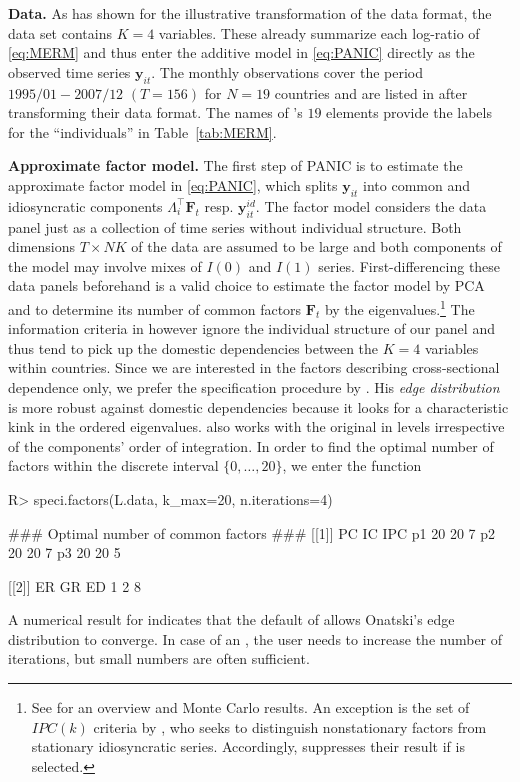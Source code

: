 \textbf{Data.} As  has shown for the illustrative transformation of the data format, the data set  contains $ K=4 $ variables. These already summarize each log-ratio of \eqref{eq:MERM} and thus enter the additive model in \eqref{eq:PANIC} directly as the observed time series $ \boldsymbol{y}_{it} $. The monthly observations cover the period $ 1995/01 - 2007/12 $ $ (T = 156) $ for $ N = 19 $ countries and are listed in  after transforming their data format. The names of 's $ 19 $ elements provide the labels for the ``individuals'' in Table~\ref{tab:MERM}.


\textbf{Approximate factor model.} The first step of PANIC is to estimate the approximate factor model in \eqref{eq:PANIC}, which splits $ \boldsymbol{y}_{it} $ into common and idiosyncratic components $ \Lambda_i^\top \boldsymbol{F}_t $ resp. $ \boldsymbol{y}^{i \! d}_{it} $. The factor model considers the data panel just as a collection of time series without individual structure. Both dimensions $ T \times NK $ of the data are assumed to be large and both components of the model may involve mixes of $  I(0) $ and $ I(1) $ series. First-differencing these data panels beforehand is a valid choice to estimate the factor model by PCA \citep{BaiNg2004} and to determine its number of common factors $ \boldsymbol{F}_t $ by the eigenvalues.\footnote{See \citet{CoronaEtAl2017} for an overview and Monte Carlo results. An exception is the set of $ IPC(k) $ criteria by \citet{Bai2004}, who seeks to distinguish nonstationary factors from stationary idiosyncratic series. Accordingly,  suppresses their result if  is selected.} The information criteria in \code{[[1]]} however ignore the individual structure of our panel and thus tend to pick up the domestic dependencies between the $ K=4 $ variables within countries. Since we are interested in the factors describing cross-sectional dependence only, we prefer the specification procedure by \citet{Onatski2010}. His \textit{edge distribution}  is more robust against domestic dependencies because it looks for a characteristic kink in the ordered eigenvalues.  also works with the original  in levels irrespective of the components' order of integration. In order to find the optimal number of factors within the discrete interval $ \lbrace 0,\ldots,20 \rbrace $, we enter the  function 
\begin{CodeChunk}
\begin{CodeInput}
R> speci.factors(L.data, k_max=20, n.iterations=4)
\end{CodeInput}
\begin{CodeOutput}
### Optimal number of common factors ###
[[1]]
   PC IC IPC
p1 20 20   7
p2 20 20   7
p3 20 20   5

[[2]]
ER GR ED 
1  2  8 
\end{CodeOutput}
\end{CodeChunk}
A numerical result for  indicates that the default of  allows Onatski's \citeyearpar{Onatski2010} edge distribution to converge. In case of an , the user needs to increase the number of iterations, but small numbers are often sufficient. 

